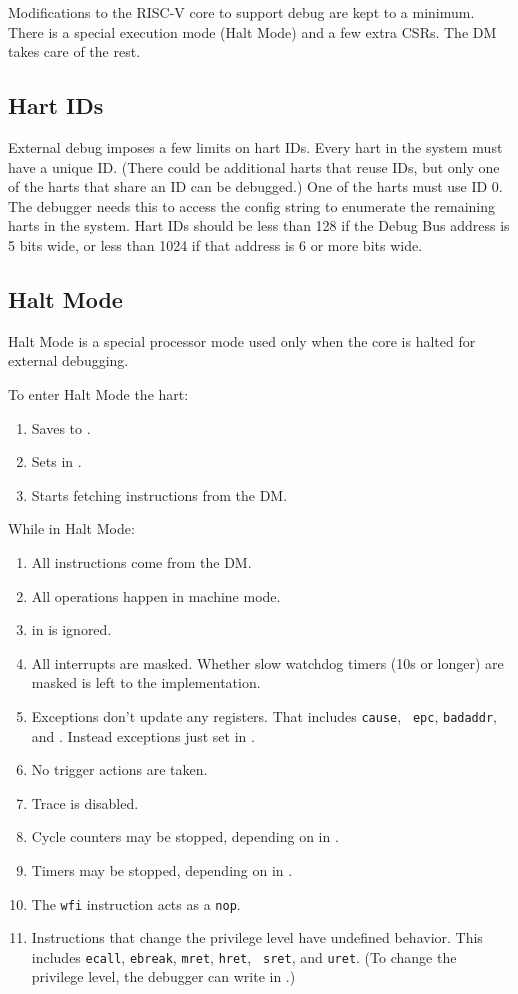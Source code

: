 \documentclass{article}
\newenvironment{steps}[1]
{
   \vspace{1ex}
   \noindent
   #1
   \begin{enumerate}[nosep]
}
{
   \end{enumerate}
   \vspace{1ex}
}
\begin{document}
Modifications to the RISC-V core to support debug are kept to a minimum.  There
is a special execution mode (Halt Mode) and a few extra CSRs. The DM takes care
of the rest.

\subsection{Hart IDs}

External debug imposes a few limits on hart IDs. Every hart in the system must
have a unique ID. (There could be additional harts that reuse IDs, but only one
of the harts that share an ID can be debugged.) One of the harts must use ID 0.
The debugger needs this to access the config string to enumerate the remaining
harts in the system. Hart IDs should be less than 128 if the Debug Bus address
is 5 bits wide, or less than 1024 if that address is 6 or more bits wide.

\subsection{Halt Mode}

Halt Mode is a special processor mode used only when the core is halted for
external debugging.

\begin{steps}{To enter Halt Mode the hart:}
\item Saves \Rpc to \Rdpc.
\item Sets \Fcause in \Rdcsr.
\item Starts fetching instructions from the DM.
\end{steps}

\begin{steps}{While in Halt Mode:}
\item All instructions come from the DM.
\item All operations happen in machine mode.
\item \Fmprv in \Rmstatus is ignored.
\item All interrupts are masked. Whether slow watchdog timers (10s or longer)
    are masked is left to the implementation.
\item Exceptions don't update any registers.  That includes {\tt cause}, {\tt
    epc}, {\tt badaddr}, and \Rmstatus.  Instead exceptions just set \Fhmexc in
    \Rdcsr.
\item No trigger actions are taken.
\item Trace is disabled.
\item Cycle counters may be stopped, depending on \Fstopcycle in \Rdcsr.
\item Timers may be stopped, depending on \Fstoptime in \Rdcsr.
\item The {\tt wfi} instruction acts as a {\tt nop}.
\item Instructions that change the privilege level have undefined behavior.
    This includes {\tt ecall}, {\tt ebreak}, {\tt mret}, {\tt hret}, {\tt
    sret}, and {\tt uret}.  (To change the privilege level, the debugger can
    write \Fprv in \Rdcsr.)
\end{steps}
\end{document}
